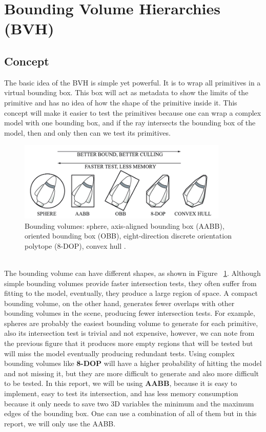 \documentclass[11pt,a4paper]{article}
\begin{document}
\clearpage

\section{Bounding Volume Hierarchies (BVH)}
\subsection{Concept}
The basic idea of the BVH is simple yet powerful. It is to wrap all primitives in a virtual bounding box. This box will act as metadata to show the limits of the primitive and has no idea of how the shape of the primitive inside it. This concept will make it easier to test the primitives because one can wrap a complex model with one bounding box, and if the ray intersects the bounding box of the model, then and only then can we test its primitives.


\begin{figure}[h]	
     \centering
     \captionsetup{justification=centering,margin=2cm}
     \includegraphics[width=10cm]{images/bvs.png}
     \caption{Bounding volumes: sphere, axis-aligned bounding box (AABB), oriented bounding box (OBB), eight-direction discrete orientation polytope (8-DOP), convex hull . \protect\cite{Ericson2004}}
     \label{fig:boundingboxes}
\end{figure}


\noindent
\\
The bounding volume can have different shapes, as shown in Figure ~\ref{fig:boundingboxes}. Although simple bounding volumes provide faster intersection tests, they often suffer from fitting to the model, eventually, they produce a large region of space. A compact bounding volume, on the other hand, generates fewer overlaps with other bounding volumes in the scene, producing fewer intersection tests. For example, spheres are probably the easiest bounding volume to generate for each primitive, also its intersection test is trivial and not expensive, however, we can note from the previous figure that it produces more empty regions that will be tested but will miss the model eventually producing redundant tests. Using complex bounding volumes like \textbf{8-DOP} will have a higher probability of hitting the model and not missing it, but they are more difficult to generate and also more difficult to be tested. In this report, we will be using \textbf{AABB}, because it is easy to implement, easy to test its intersection, and has less memory consumption because it only needs to save two 3D variables the minimum and the maximum edges of the bounding box. One can use a combination of all of them but in this report, we will only use the AABB. 
\end{document}
